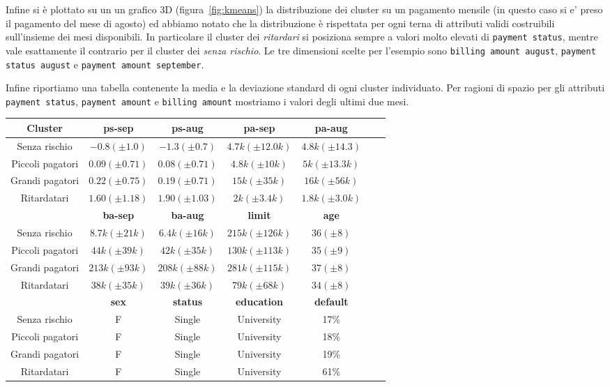 Infine si \`e plottato su un un grafico 3D (figura~\ref{fig:kmeans})
la distribuzione dei cluster su un pagamento mensile (in questo 
caso si e' preso il pagamento del mese di agosto) ed abbiamo 
notato che la distribuzione \`e rispettata per ogni terna di attributi
validi costruibili sull'insieme dei mesi disponibili.
In particolare il cluster dei \textit{ritardari} si posiziona sempre
a valori molto elevati di \texttt{payment status}, mentre vale
esattamente il contrario per il cluster dei \textit{senza rischio}.
Le tre
dimensioni scelte per l'esempio sono \texttt{billing amount august},
\texttt{payment status august} e \texttt{payment amount september}.

Infine riportiamo una tabella contenente la media e la deviazione 
standard di ogni cluster individuato. Per ragioni di spazio per 
gli attributi \texttt{payment status}, \texttt{payment amount}
e \texttt{billing amount} mostriamo i valori degli ultimi due mesi.

\begin{center}
	
\begin{tabular}{c|c|c|c|c|c|c}
	\hline
	\textbf{Cluster} & \textbf{ps-sep} 
	& \textbf{ps-aug} & \textbf{pa-sep} 
	& \textbf{pa-aug}\\
	\hline
	Senza rischio & 
	$-0.8 (\pm 1.0)$ & 
	$-1.3 (\pm 0.7)$ &
	$4.7k (\pm 12.0k)$ &
	$4.8k (\pm 14.3)$\\
	\hline
	Piccoli pagatori & 
	$0.09 (\pm 0.71)$ & 
	$0.08 (\pm 0.71)$ &
	$4.8k (\pm 10k)$ &
	$5k (\pm 13.3k)$\\
	\hline
	Grandi pagatori & 
	$0.22 (\pm 0.75)$ & 
	$0.19 (\pm 0.71)$ &
	$15k (\pm 35k)$ &
	$16k (\pm 56k)$\\
	\hline
	Ritardatari & 
	$1.60 (\pm 1.18)$ & 
	$1.90 (\pm 1.03)$ &
	$2k (\pm 3.4k)$ &
	$1.8k (\pm 3.0k)$\\
	\hline
	& 
	\textbf{ba-sep} & 
	\textbf{ba-aug} & 
	\textbf{limit} & 
	\textbf{age} &\\
	\hline
	Senza rischio & 
	$8.7k (\pm 21k)$ &
	$6.4k (\pm 16k)$ &
	$215k (\pm 126k)$ &
	$36 (\pm 8)$\\
	\hline
	Piccoli pagatori &
	$44k (\pm 39k)$ &
	$42k (\pm 35k)$ &
	$130k (\pm 113k)$ &
	$35 (\pm 9)$\\
	\hline
	Grandi pagatori &
	$213k (\pm 93k)$ &
	$208k (\pm 88k)$ &
	$281k (\pm 115k)$ &
	$37 (\pm 8)$\\
	\hline
	Ritardatari &
	$38k (\pm 35k)$ &
	$39k (\pm 36k)$ &
	$79k (\pm 68k)$ &
	$34 (\pm 8)$\\
	\hline
	& 
	\textbf{sex} & 
	\textbf{status} & 
	\textbf{education} & 
	\textbf{default}\\
	\hline
	Senza rischio & 
	F &
	Single &
	University&
	17\%\\
	\hline
	Piccoli pagatori & 
	F &
	Single &
	University&
	18\%\\
	\hline
	Grandi pagatori & 
	F &
	Single &
	University&
	19\%\\
	\hline
	Ritardatari & 
	F &
	Single &
	University&
	61\%\\
	\hline
\end{tabular}

\end{center}

